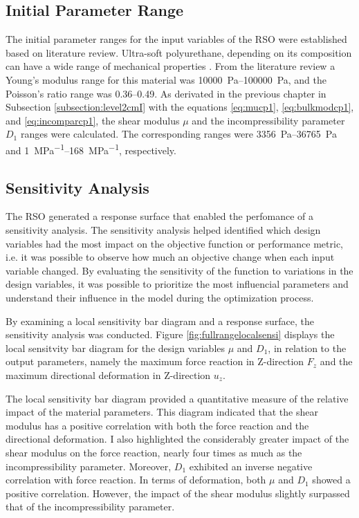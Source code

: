 \subsection*{Initial Parameter Range}
The initial parameter ranges for the input variables of the RSO were established based on literature review.
Ultra-soft polyurethane, depending on its composition can have a wide range of mechanical properties \cite{Wendels2021}.
From the literature review a Young's modulus range for this material was \SIrange{10000}{100000}{\pascal}, and the 
Poisson's ratio range was \SIrange{0.36}{0.49}{}. As derivated in the previous chapter in 
Subsection \ref{subsection:level2cmI} with the equations \ref{eq:mucp1}, \ref{eq:bulkmodcp1}, 
and \ref{eq:incomparcp1}, the shear modulus $\mu$ and the incompressibility parameter $D_1$ ranges were calculated.
The corresponding ranges were \SIrange{3356}{36765}{\pascal} and \SIrange{1}{168}{\mega\pascal\tothe{-1}}, respectively.

\subsection*{Sensitivity Analysis}
The RSO generated a response surface that enabled the perfomance of a sensitivity analysis.
The sensitivity analysis helped identified which design variables had the most impact 
on the objective function or performance metric, i.e. it was possible to observe how much 
an objective change when each input variable changed. By evaluating the sensitivity of the 
function to variations in the design variables, it was possible to prioritize the most 
influencial parameters and understand their influence in the model during the optimization 
process.

By examining a local sensitivity bar diagram and a response surface, the sensitivity analysis was conducted.
Figure \ref{fig:fullrangelocalsensi} displays the local sensitvity bar diagram for the design variables
$\mu$ and $D_1$, in relation to the output parameters, namely the maximum force reaction in Z-direction $F_z$ 
and the maximum directional deformation in Z-direction $u_z$. 

The local sensitivity bar diagram provided a quantitative measure of the relative impact of the material 
parameters. This diagram indicated that the shear modulus has a positive correlation with both the force
reaction and the directional deformation. I also highlighted the considerably greater impact of the shear modulus 
on the force reaction, nearly four times as much as the incompressibility parameter. Moreover, $D_1$ exhibited 
an inverse negative correlation with force reaction.
In terms of deformation, both $\mu$ and $D_1$ showed a positive correlation. However, the impact of the 
shear modulus slightly surpassed that of the incompressibility parameter.\\

